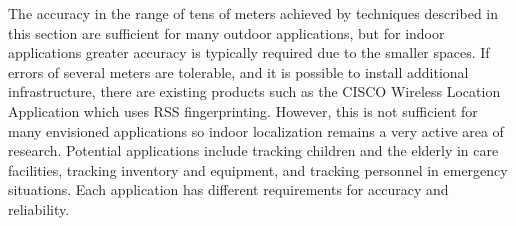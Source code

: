 
The accuracy in the range of tens of meters achieved by techniques described in this section are sufficient for many outdoor applications, but for indoor applications greater accuracy is typically required due to the smaller spaces. If errors of several meters are tolerable, and it is possible to install additional infrastructure, there are existing products such as the CISCO Wireless Location Application \cite{CiscoWLA} which uses RSS fingerprinting. However, this is not sufficient for many envisioned applications so indoor localization remains a very active area of research. Potential applications include tracking children and the elderly in care facilities, tracking inventory and equipment, and tracking personnel in emergency situations. Each application has different requirements for accuracy and reliability.

